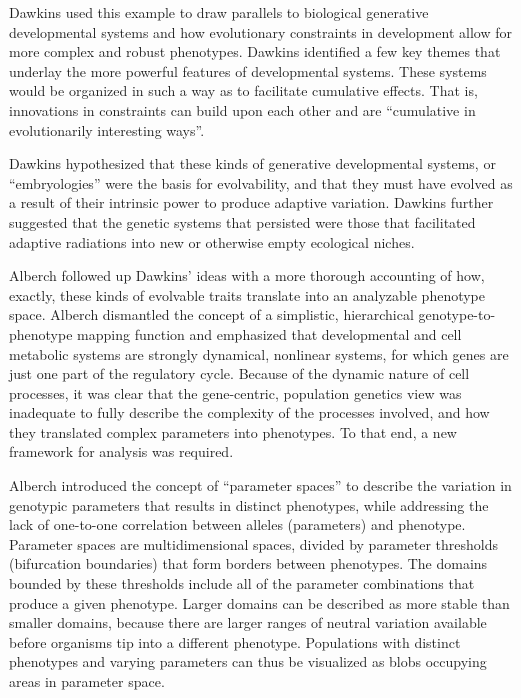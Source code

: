\documentclass[PhD]{msu-thesis}
\begin{document}
Dawkins used this example to draw parallels to biological generative developmental systems and how evolutionary constraints in development allow for more complex and robust phenotypes. Dawkins identified a few key themes that underlay the more powerful features of developmental systems. These systems would be organized in such a way as to facilitate cumulative effects. That is, innovations in constraints can build upon each other and are “cumulative in evolutionarily interesting ways”\cite{dawkins_13_2003}.

Dawkins hypothesized that these kinds of generative developmental systems, or “embryologies” were the basis for evolvability, and that they must have evolved as a result of their intrinsic power to produce adaptive variation. Dawkins further suggested that the genetic systems that persisted were those that facilitated adaptive radiations into new or otherwise empty ecological niches.

Alberch followed up Dawkins’ ideas with a more thorough accounting of how, exactly, these kinds of evolvable traits translate into an analyzable phenotype space\cite{alberch_genes_1991}. Alberch dismantled the concept of a simplistic, hierarchical genotype-to-phenotype mapping function and emphasized that developmental and cell metabolic systems are strongly dynamical, nonlinear systems, for which genes are just one part of the regulatory cycle. Because of the dynamic nature of cell processes, it was clear that the gene-centric, population genetics view was inadequate to fully describe the complexity of the processes involved, and how they translated complex parameters into phenotypes. To that end, a new framework for analysis was required.

Alberch introduced the concept of “parameter spaces” to describe the variation in genotypic parameters that results in distinct phenotypes, while addressing the lack of one-to-one correlation between alleles (parameters) and phenotype. Parameter spaces are multidimensional spaces, divided by parameter thresholds (bifurcation boundaries) that form borders between phenotypes. The domains bounded by these thresholds include all of the parameter combinations that produce a given phenotype. Larger domains can be described as more stable than smaller domains, because there are larger ranges of neutral variation available before organisms tip into a different phenotype. Populations with distinct phenotypes and varying parameters can thus be visualized as blobs occupying areas in parameter space.
\end{document}
